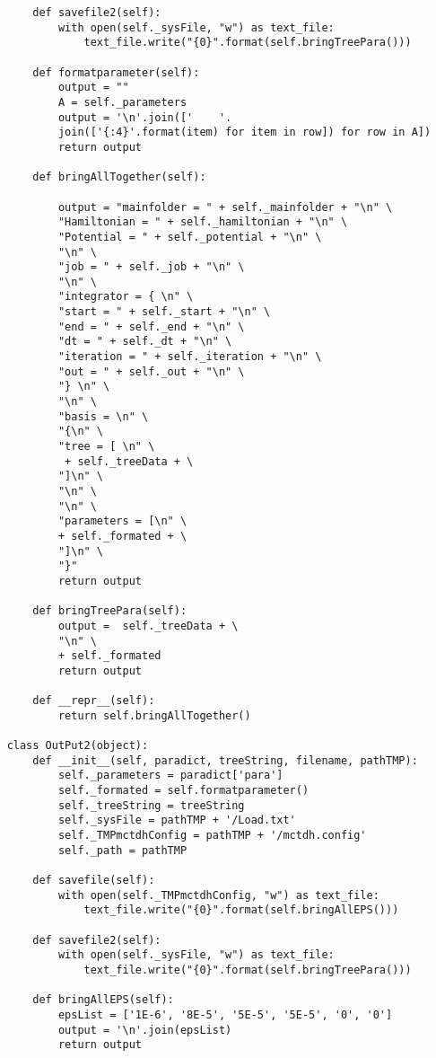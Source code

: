 \begin{verbatim}
        def savefile2(self):
            with open(self._sysFile, "w") as text_file:
                text_file.write("{0}".format(self.bringTreePara()))
    
        def formatparameter(self):
            output = ""
            A = self._parameters        
            output = '\n'.join(['    '.
            join(['{:4}'.format(item) for item in row]) for row in A])
            return output
    
        def bringAllTogether(self):
    
            output = "mainfolder = " + self._mainfolder + "\n" \
            "Hamiltonian = " + self._hamiltonian + "\n" \
            "Potential = " + self._potential + "\n" \
            "\n" \
            "job = " + self._job + "\n" \
            "\n" \
            "integrator = { \n" \
            "start = " + self._start + "\n" \
            "end = " + self._end + "\n" \
            "dt = " + self._dt + "\n" \
            "iteration = " + self._iteration + "\n" \
            "out = " + self._out + "\n" \
            "} \n" \
            "\n" \
            "basis = \n" \
            "{\n" \
            "tree = [ \n" \
             + self._treeData + \
            "]\n" \
            "\n" \
            "\n" \
            "parameters = [\n" \
            + self._formated + \
            "]\n" \
            "}"
            return output
    
        def bringTreePara(self):
            output =  self._treeData + \
            "\n" \
            + self._formated
            return output
    
        def __repr__(self):
            return self.bringAllTogether()
    
    class OutPut2(object):
        def __init__(self, paradict, treeString, filename, pathTMP):
            self._parameters = paradict['para']
            self._formated = self.formatparameter()
            self._treeString = treeString
            self._sysFile = pathTMP + '/Load.txt'
            self._TMPmctdhConfig = pathTMP + '/mctdh.config'
            self._path = pathTMP
    
        def savefile(self):
            with open(self._TMPmctdhConfig, "w") as text_file:
                text_file.write("{0}".format(self.bringAllEPS()))
    
        def savefile2(self):
            with open(self._sysFile, "w") as text_file:
                text_file.write("{0}".format(self.bringTreePara()))
    
        def bringAllEPS(self):
            epsList = ['1E-6', '8E-5', '5E-5', '5E-5', '0', '0']
            output = '\n'.join(epsList)
            return output
    

\end{verbatim}
